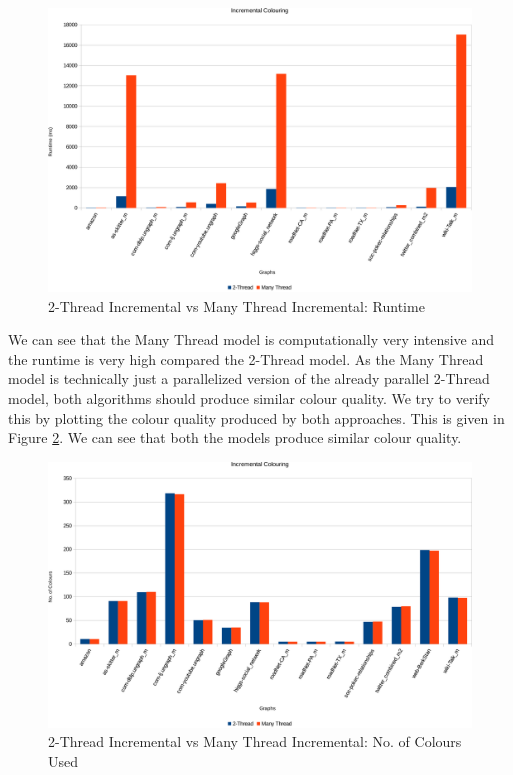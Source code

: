 \documentclass[MTech]{iitmdiss}
\begin{document}
\begin{figure}[h]
    \centering
    \includegraphics[width=\textwidth,keepaspectratio=true]{chartNewest15.pdf}
    \caption{
        2-Thread Incremental vs Many Thread Incremental: Runtime
    }
    \label{fig:chart12}
\end{figure}

We can see that the Many Thread model is computationally very intensive and the runtime is very high compared the 2-Thread model. As the Many Thread model is technically just a parallelized version of the already parallel 2-Thread model, both algorithms should produce similar colour quality. We try to verify this by plotting the colour quality produced by both approaches. This is given in Figure \ref{fig:chart13}. We can see that both the models produce similar colour quality.

\begin{figure}[h]
    \centering
    \includegraphics[width=\textwidth,keepaspectratio=true]{chartNewest21.pdf}
    \caption{
        2-Thread Incremental vs Many Thread Incremental: No. of Colours Used
    }
    \label{fig:chart13}
\end{figure}
\end{document}

